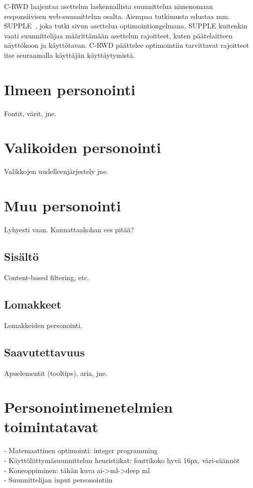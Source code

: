 \documentclass[finnish, 12pt, a4paper, elec, utf8, a-1b, online]{aaltothesis}
\begin{document}
C-RWD laajentaa asettelun laskennallista suunnittelua nimenomaan responsiivisen
web-suunnittelun osalta. Aiempaa tutkimusta edustaa mm.
SUPPLE~\cite{10.1145/964442.964461}, joka tutki sivun asettelua
optimointiongelmana. SUPPLE kuitenkin vaati suunnittelijaa määrittämään
asettelun rajoitteet, kuten päätelaitteen näyttökoon ja käyttötavan. C-RWD
päättelee optimointiin tarvittavat rajoitteet itse seuraamalla käyttäjän
käyttäytymistä.

\section{Ilmeen personointi}

Fontit, värit, jne.

\section{Valikoiden personointi}\label{menus}

Valikkojen uudelleenjärjestely jne.

\section{Muu personointi}

Lyhyesti vaan. Kannattaakohan ees pitää?

\subsection{Sisältö}

Content-based filtering, etc.

\subsection{Lomakkeet}

Lomakkeiden personointi.

\subsection{Saavutettavuus}

Apuelementit (tooltips), aria, jne.

\clearpage

\section{Personointimenetelmien toimintatavat}

- Matemaattinen optimointi: integer programming
\\
- Käyttöliittymäsuunnittelun heuristiikat: fonttikoko hyvä 16px, väri-säännöt
\\
- Koneoppiminen: tähän kuva ai->ml->deep ml
\\
- Suunnittelijan input personointiin
\end{document}
